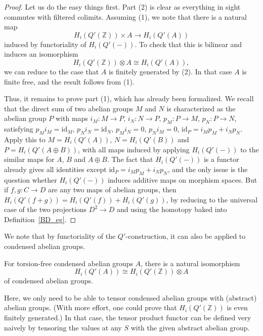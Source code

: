 \begin{proof}
  \leanok
  Let us do the easy things first. Part (2) is clear as everything in sight commutes with filtered colimits.
  Assuming (1), we note that there is a natural map
  \[ H_i(Q'(\mathbb Z))\times A\longrightarrow H_i(Q'(A)) \]
  induced by functoriality of $H_i(Q'(-))$. To check that this is bilinear and induces an isomorphism
  \[ H_i(Q'(\mathbb Z))\otimes A\cong H_i(Q'(A)), \]
  we can reduce to the case that $A$ is finitely generated by (2).
  In that case $A$ is finite free, and the result follows from (1).

  Thus, it remains to prove part (1), which has already been formalized.
  We recall that the direct sum of two abelian groups $M$ and $N$
  is characterized as the abelian group $P$ with maps $i_M: M\to P$, $i_N: N\to P$, $p_M: P\to M$, $p_N: P\to N$,
  satisfying $p_M i_M=\mathrm{id}_M$, $p_N i_N = \mathrm{id}_N$, $p_M i_N=0$, $p_N i_M = 0$, $\mathrm{id}_P = i_M p_M + i_N p_N$.
  Apply this to $M=H_i(Q'(A))$, $N=H_i(Q'(B))$ and $P=H_i(Q'(A\oplus B))$,
  with all maps induced by applying $H_i(Q'(-))$ to the similar maps for $A$, $B$ and $A\oplus B$.
  The fact that $H_i(Q'(-))$ is a functor already gives all identities except $\mathrm{id}_P = i_M p_M + i_N p_N$,
  and the only issue is the question whether $H_i(Q'(-))$ induces additive maps on morphism spaces.
  But if $f,g: C\to D$ are any two maps of abelian groups, then $H_i(Q'(f+g)) = H_i(Q'(f))+H_i(Q'(g))$,
  by reducing to the universal case of the two projections $D^2\to D$ and using the homotopy baked into Definition~\ref{BD_eg}.
\end{proof}

We note that by functoriality of the $Q'$-construction, it can also be applied to condensed abelian groups.

\begin{corollary}
  \label{Qprime-Cond}
  \leanok
  For torsion-free condensed abelian groups $A$, there is a natural isomorphism
  \[ H_i(Q'(A))\cong H_i(Q'(\mathbb Z))\otimes A \]
  of condensed abelian groups.
\end{corollary}

Here, we only need to be able to tensor condensed abelian groups with (abstract) abelian groups.
(With more effort, one could prove that $H_i(Q'(\mathbb Z))$ is even finitely generated.)
In that case, the tensor product functor can be defined very naively by tensoring the values at any $S$ with the given abstract abelian group.

